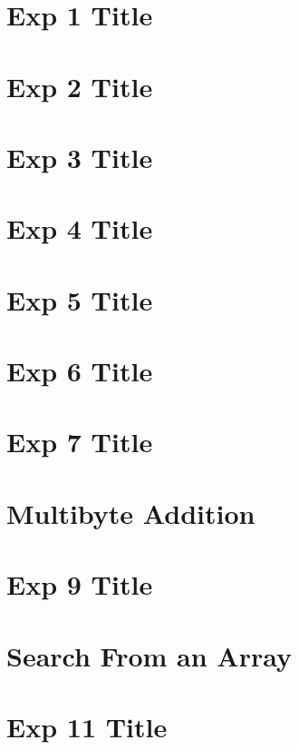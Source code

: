 \documentclass[12pt]{report}
\begin{document}
  \chapter{Exp 1 Title}
  
  
  \chapter{Exp 2 Title}
  
  
  \chapter{Exp 3 Title}
  
    
  \chapter{Exp 4 Title}
  
      
  \chapter{Exp 5 Title}
  
  
  \chapter{Exp 6 Title}
  
  
  \chapter{Exp 7 Title}
  
  
  \chapter{Multibyte Addition}
  
  
  \chapter{Exp 9 Title}
  
  
  \chapter{Search From an Array}
  
  
  \chapter{Exp 11 Title}
  
  
\end{document}
